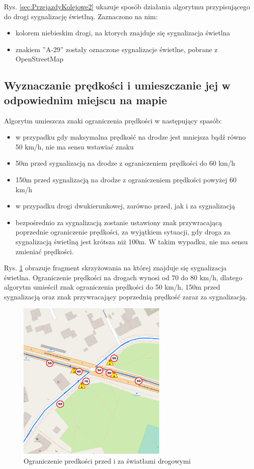 Rys. \ref{sec:PrzejazdyKolejowe2} ukazuje sposób działania algorytmu przypisującego do drogi sygnalizację świetlną. Zaznaczono na nim:
\begin{itemize}
\item kolorem niebieskim drogi, na ktorych znajduje się sygnalizacja świetlna
\item znakiem ''A-29'' zostały oznaczone sygnalizacje świetlne, pobrane z OpenStreetMap
\end{itemize}

\newpage
\subsection{Wyznaczanie prędkości i umieszczanie jej w odpowiednim miejscu na mapie}

Algorytm umieszcza znaki ograniczenia prędkości w następujący spasób:
\begin{itemize}
\item w przypadku gdy maksymalna prędkość na drodze jest mniejsza bądź równo 50 km/h, nie ma sensu wstawiać znaku
\item 50m przed sygnalizacją na drodze z ograniczeniem prędkości do 60 km/h
\item 150m przed sygnalizacją na drodze z ograniczeniem prędkości powyżej 60 km/h
\item w przypadku drogi dwukierunkowej, zarówno przed, jak i za sygnalizacją
\item bezpośrednio za sygnalizacją zostanie ustawiony znak przywracającą poprzednie ograniczenie prędkości, za wyjątkiem sytuacji, gdy droga za sygnalizacją świetlną jest krótsza niż 100m. W takim wypadku, nie ma sensu zmieniać prędkości.
\end{itemize}


Rys. \ref{sec:znakiSwiatla} obrazuje fragment skrzyżowania na której znajduje się sygnalizacja świetlna. Ograniczenie prędkości na drogach wynosi od 70 do 80 km/h, dlatego algorytm umieścił znak ograniczenia prędkości do 50 km/h, 150m przed sygnalizacją oraz znak przywracający poprzednią prędkość zaraz za sygnalizacją.

\begin{figure}[h]
\caption{Ograniczenie predkości przed i za światłami drogowymi}
\label{sec:znakiSwiatla}
\centering
\includegraphics[width=0.65\textwidth]{speedBeforeSignals}
\end{figure}

